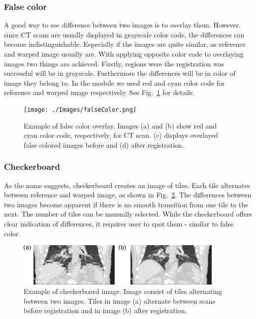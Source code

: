\documentclass[type=dr, dr=rernat, accentcolor=tud7b,colorbacktitle, bigchapter, openright, twoside, 12pt ]{tudthesis}
\begin{document}
\subsubsection{False color}
\label{Sec:FalseColor}

A good way to see difference between two images is to overlay them. However, since CT scans are usually displayed in grayscale color code, the differences can become indistinguishable. Especially if the images are quite similar, as reference and warped image usually are. With applying opposite color code to overlaying images two things are achieved. Firstly, regions were the registration was successful will be in grayscale. Furthermore the differences will be in color of image they belong to. In the module we used red and cyan color code for reference and warped image respectively. See Fig.~\ref{falseColor} for details.

\begin{figure}[H]
	\begin{center}		
		\texttt{[image: ./Images/falseColor.png]}
		\caption{Example of false color overlay. Images (a) and (b) show red and cyan color code, respectively, for CT scan. (c) displays overlayed false colored images before and (d) after registration.}
		\label{falseColor}
	\end{center}
\end{figure}

\subsubsection{Checkerboard}

As the name suggests, checkerboard creates an image of tiles. Each tile alternates between reference and warped image, as shown in Fig.~\ref{checkerboard}. The differences between two images become apparent if there is no smooth transition from one tile to the next. The number of tiles can be manually selected. While the checkerboard offers clear indication of differences, it requires user to spot them - similar to false color.

\begin{figure}[H]
	\begin{center}		
		\includegraphics[width=0.9\textwidth]{./Images/checkerboard.png}
		\caption{Example of checkerboard image. Image consist of tiles alternating between two images. Tiles in image (a) alternate between scans before registration and in image (b) after registration.}
		\label{checkerboard}
	\end{center}
\end{figure}
\end{document}
